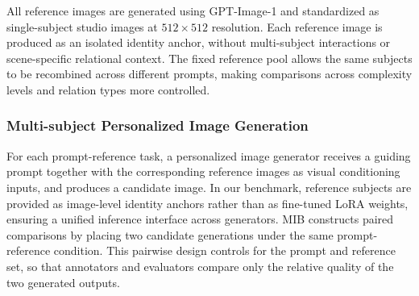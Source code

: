 \documentclass{article}
\begin{document}
All reference images are generated using GPT-Image-1 and standardized as single-subject studio images at $512 \times 512$ resolution. Each reference image is produced as an isolated identity anchor, without multi-subject interactions or scene-specific relational context. The fixed reference pool allows the same subjects to be recombined across different prompts, making comparisons across complexity levels and relation types more controlled.

\subsubsection{Multi-subject Personalized Image Generation}

For each prompt-reference task, a personalized image generator receives a guiding prompt together with the corresponding reference images as visual conditioning inputs, and produces a candidate image. In our benchmark, reference subjects are provided as image-level identity anchors rather than as fine-tuned LoRA weights, ensuring a unified inference interface across generators. MIB constructs paired comparisons by placing two candidate generations under the same prompt-reference condition. This pairwise design controls for the prompt and reference set, so that annotators and evaluators compare only the relative quality of the two generated outputs.
\end{document}

